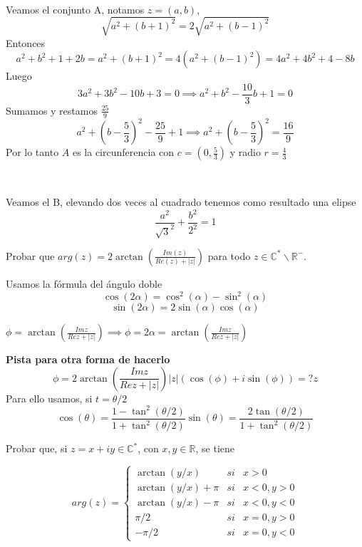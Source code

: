 \begin{sol}

\

Veamos el conjunto A, notamos $z=(a,b)$,
$$ \sqrt{a^2+(b+1)^2} = 2\sqrt{a^2+(b-1)^2}$$
Entonces $$a^2+b^2+1+2 b = a^2+(b+1)^2 = 4(a^2+(b-1)^2) = 4a^2+4b^2+4-8b$$
Luego
$$3a^2+3b^2-10b+3=0 \implies a^2+b^2-\frac{10}{3}b+1=0$$
Sumamos y restamos $\frac{25}{9}$
$$a^2+(b-\frac{5}{3})^2-\frac{25}{9}+1 \implies a^2+(b-\frac{5}{3})^2=\frac{16}{9}$$
Por lo tanto $A$ es la circunferencia con $c=(0, \frac{5}{3})$ y radio $r=\frac{4}{3}$

\

Veamos el B, elevando dos veces al cuadrado tenemos como resultado una elipse
$$ \frac{a^2}{\sqrt{3}^2} + \frac{b^2}{2^2} = 1 $$
\end{sol}



\begin{ejer}
	Probar que $arg(z) = 2\arctan\left( \frac{Im(z)}{Re(z) + |z|} \right)$ para todo  $z\in\mathbb{C}^{\ast}\backslash\mathbb{R}^{-}$.
\end{ejer}

\begin{sol}

Usamos la fórmula del ángulo doble
$$ \cos(2\alpha) = \cos^2(\alpha)-\sin^2(\alpha) $$
$$ \sin(2\alpha) = 2\sin(\alpha)\cos(\alpha) $$

$\phi = \arctan(\frac{Im z}{Re z + |z|}) \implies \phi = 2\alpha = \arctan(\frac{Im z}{Re z + |z|}) $

\textbf{Pista para otra forma de hacerlo}
$$ \phi = 2\arctan ( \frac{Im z}{Re z + |z|} ) 
|z|(\cos(\phi)+i\sin(\phi)) =? z $$
Para ello usamos, si $t=\theta/2$
$$ \cos(\theta) = \frac{1-\tan^2(\theta/2)}{1+\tan^2(\theta/2)}
\sin(\theta) = \frac{2\tan(\theta/2)}{1+\tan^2(\theta/2)} $$
\end{sol}


\begin{ejer}
	Probar que, si $z=x+iy\in\mathbb{C}^{\ast}$, con $x,y\in\mathbb{R}$, se tiene
	
	$$
	arg(z) = \left\{ 
		\begin{array}{lcc}
			\arctan(y/x) &   si  & x>0 \\
			\arctan(y/x) + \pi & si & x<0, y>0 \\
			\arctan(y/x)-\pi & si & x<0,y<0 \\
			\pi/2 & si & x=0,y>0 \\
			-\pi/2 & si & x=0,y<0 
		\end{array}
	\right.
	$$
\end{ejer}


